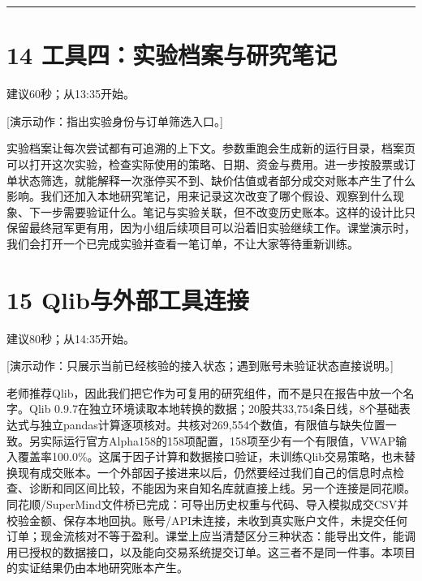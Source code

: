 \documentclass[UTF8,a4paper,12pt]{ctexart}
\begin{document}
\vspace{6mm}\noindent\textcolor{accent!40}{\rule{\textwidth}{0.4pt}}\par

\section*{\color{ink}14  工具四：实验档案与研究笔记}

{\small\color{accent}建议60秒；从13:35开始。}\par

{\small\color{accent}[演示动作：指出实验身份与订单筛选入口。]}\par

实验档案让每次尝试都有可追溯的上下文。参数重跑会生成新的运行目录，档案页可以打开这次实验，检查实际使用的策略、日期、资金与费用。进一步按股票或订单状态筛选，就能解释一次涨停买不到、缺价估值或者部分成交对账本产生了什么影响。我们还加入本地研究笔记，用来记录这次改变了哪个假设、观察到什么现象、下一步需要验证什么。笔记与实验关联，但不改变历史账本。这样的设计比只保留最终冠军更有用，因为小组后续项目可以沿着旧实验继续工作。课堂演示时，我们会打开一个已完成实验并查看一笔订单，不让大家等待重新训练。


\newpage
\section*{\color{ink}15  Qlib与外部工具连接}

{\small\color{accent}建议80秒；从14:35开始。}\par

{\small\color{accent}[演示动作：只展示当前已经核验的接入状态；遇到账号未验证状态直接说明。]}\par

老师推荐Qlib，因此我们把它作为可复用的研究组件，而不是只在报告中放一个名字。Qlib 0.9.7在独立环境读取本地转换的数据；20股共33,754条日线，8个基础表达式与独立pandas计算逐项核对。共核对269,554个数值，有限值与缺失位置一致。另实际运行官方Alpha158的158项配置，158项至少有一个有限值，VWAP输入覆盖率100.0\%。这属于因子计算和数据接口验证，未训练Qlib交易策略，也未替换现有成交账本。一个外部因子接进来以后，仍然要经过我们自己的信息时点检查、诊断和同区间比较，不能因为来自知名库就直接上线。另一个连接是同花顺。同花顺/SuperMind文件桥已完成：可导出历史权重与代码、导入模拟成交CSV并校验金额、保存本地回执。账号/API未连接，未收到真实账户文件，未提交任何订单；现金流核对不等于盈利。课堂上应当清楚区分三种状态：能导出文件，能调用已授权的数据接口，以及能向交易系统提交订单。这三者不是同一件事。本项目的实证结果仍由本地研究账本产生。
\end{document}
